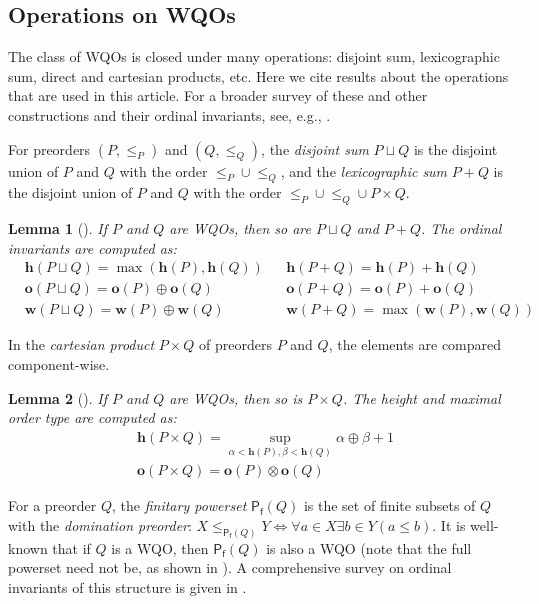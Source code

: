 \documentclass[10pt,a4paper]{amsart}
\let \leq \leqslant
\renewcommand \S [1][]{\mathsf{P_f^{#1}}}
\def \h {\textbf{h}}
\def \o {\textbf{o}}
\def \w {\textbf{w}}
\newtheorem{lemma}{Lemma}
\begin{document}
\subsection{Operations on WQOs}

The class of WQOs is closed under many operations: disjoint sum, lexicographic sum, direct and cartesian products, etc. Here we cite results about the operations that are used in this article. For a broader survey of these and other constructions and their ordinal invariants, see, e.g., \cite{Dzamonja2020}.

For preorders $(P, \leq_P)$ and $(Q, \leq_Q)$, the \textit{disjoint sum} $P \sqcup Q$ is the disjoint union of $P$ and $Q$ with the order $\leq_P \cup \leq_Q$, and the \textit{lexicographic sum} $P + Q$ is the disjoint union of $P$ and $Q$ with the order $\leq_P \cup \leq_Q \cup P \times Q$.

\begin{lemma}[\cite{Abraham1999,deJongh1977,Dzamonja2020}]\label{h o w(cup)}
    If $P$ and $Q$ are WQOs, then so are $P \sqcup Q$ and $P + Q$. The ordinal invariants are computed as:
    \begin{align*}
        &\h(P \sqcup Q)=\max(\h(P),\h(Q))&&\h(P+Q)=\h(P)+\h(Q)\\
        &\o(P \sqcup Q)=\o(P)\oplus\o(Q)&&\o(P+Q)=\o(P)+\o(Q)\\
        &\w(P \sqcup Q)=\w(P)\oplus\w(Q)&&\w(P+Q)=\max(\w(P),\w(Q))
    \end{align*}
\end{lemma}

In the \textit{cartesian product} $P \times Q$ of preorders $P$ and $Q$, the elements are compared component-wise.

\begin{lemma}[\cite{deJongh1977}]\label{h o(times)}
    If $P$ and $Q$ are WQOs, then so is $P \times Q$. The height and maximal order type are computed as:
    \begin{align*}
        &\h(P \times Q) = \sup_{\alpha < \h(P), \beta < \h(Q)} \alpha\oplus\beta+1\\
        &\o(P \times Q) = \o(P) \otimes \o(Q)
    \end{align*}
\end{lemma}

For a preorder $Q$, the \textit{finitary powerset} $\S(Q)$ is the set of finite subsets of $Q$ with the \textit{domination preorder}: $X \leq_{\S(Q)} Y \iff \forall a \in X \exists b \in Y (a \leq b)$. It is well-known that if $Q$ is a WQO, then $\S(Q)$ is also a WQO (note that the full powerset need not be, as shown in \cite{Rado1954}). A comprehensive survey on ordinal invariants of this structure is given in \cite{Abriola2023}.
\end{document}
